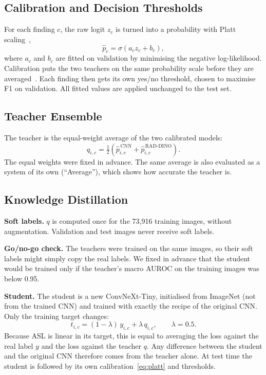 \documentclass[conference]{IEEEtran}
\begin{document}
\subsection{Calibration and Decision Thresholds}
For each finding $c$, the raw logit $z_c$ is turned into a probability with Platt scaling~\cite{platt1999probabilistic},
\begin{equation}
\hat{p}_c = \sigma(a_c z_c + b_c),
\label{eq:platt}
\end{equation}
where $a_c$ and $b_c$ are fitted on validation by minimising the negative log-likelihood. Calibration puts the two teachers on the same probability scale before they are averaged~\cite{guo2017calibration}. Each finding then gets its own yes/no threshold, chosen to maximise F1 on validation. All fitted values are applied unchanged to the test set.

\subsection{Teacher Ensemble}
The teacher is the equal-weight average of the two calibrated models:
\begin{equation}
q_{i,c} = \tfrac{1}{2}\left(\hat{p}^{\,\text{CNN}}_{i,c} + \hat{p}^{\,\text{RAD-DINO}}_{i,c}\right).
\label{eq:teacher}
\end{equation}
The equal weights were fixed in advance. The same average is also evaluated as a system of its own (``Average''), which shows how accurate the teacher is.

\subsection{Knowledge Distillation}
\textbf{Soft labels.} $q$ is computed once for the 73,916 training images, without augmentation. Validation and test images never receive soft labels.

\textbf{Go/no-go check.} The teachers were trained on the same images, so their soft labels might simply copy the real labels. We fixed in advance that the student would be trained only if the teacher's macro AUROC on the training images was below 0.95.

\textbf{Student.} The student is a new ConvNeXt-Tiny, initialised from ImageNet (not from the trained CNN) and trained with exactly the recipe of the original CNN. Only the training target changes:
\begin{equation}
t_{i,c} = (1-\lambda)\,y_{i,c} + \lambda\,q_{i,c}, \qquad \lambda = 0.5 .
\label{eq:target}
\end{equation}
Because ASL is linear in its target, this is equal to averaging the loss against the real label $y$ and the loss against the teacher $q$. Any difference between the student and the original CNN therefore comes from the teacher alone. At test time the student is followed by its own calibration~\eqref{eq:platt} and thresholds.
\end{document}
